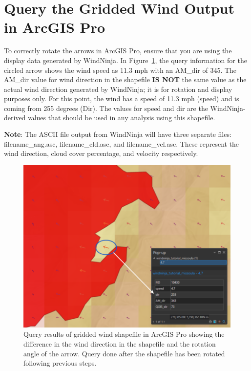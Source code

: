 \documentclass[12pt]{article}
\begin{document}
\section*{Query the Gridded Wind Output in ArcGIS Pro}
To correctly rotate the arrows in ArcGIS Pro, ensure that you are using the display data generated by WindNinja. In Figure~\ref{fig:Figure14}, the query information for the circled arrow shows the wind speed as 11.3 mph with an AM\_dir of 345. The AM\_dir value for wind direction in the shapefile \textbf{IS NOT} the same value as the actual wind direction generated by WindNinja; it is for rotation and display purposes only. For this point, the wind has a speed of 11.3 mph (speed) and is coming from 255 degrees (Dir). The values for speed and dir are the WindNinja-derived values that should be used in any analysis using this shapefile.

\textbf{Note}: The ASCII file output from WindNinja will have three separate files: filename\_ang.asc, filename\_cld.asc, and filename\_vel.asc. These represent the wind direction, cloud cover percentage, and velocity  respectively. 

\begin{figure}[H]
	\centering
	\includegraphics[scale=0.4]{arc_14.png}
	\caption{Query results of gridded wind shapefile in ArcGIS Pro showing the difference in the wind direction in the shapefile and the rotation angle of the arrow. Query done after the shapefile has been rotated following previous steps.}
\label{fig:Figure14}
\end{figure}
\end{document}
